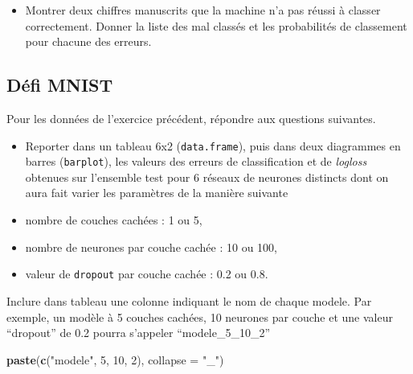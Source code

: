 \documentclass[]{article}
\newenvironment{Shaded}{\begin{snugshade}}{\end{snugshade}}
\newcommand{\KeywordTok}[1]{\textcolor[rgb]{0.13,0.29,0.53}{\textbf{#1}}}
\newcommand{\DataTypeTok}[1]{\textcolor[rgb]{0.13,0.29,0.53}{#1}}
\newcommand{\DecValTok}[1]{\textcolor[rgb]{0.00,0.00,0.81}{#1}}
\newcommand{\StringTok}[1]{\textcolor[rgb]{0.31,0.60,0.02}{#1}}
\newcommand{\CommentTok}[1]{\textcolor[rgb]{0.56,0.35,0.01}{\textit{#1}}}
\newcommand{\OperatorTok}[1]{\textcolor[rgb]{0.81,0.36,0.00}{\textbf{#1}}}
\newcommand{\NormalTok}[1]{#1}
\providecommand{\tightlist}{%
  \setlength{\itemsep}{0pt}\setlength{\parskip}{0pt}}
\begin{document}
\begin{Shaded}
\end{Shaded}

\begin{itemize}
\tightlist
\item
  Montrer deux chiffres manuscrits que la machine n'a pas réussi à
  classer correctement. Donner la liste des mal classés et les
  probabilités de classement pour chacune des erreurs.
\end{itemize}

\subsection{Défi MNIST}\label{defi-mnist}

Pour les données de l'exercice précédent, répondre aux questions
suivantes.

\begin{itemize}
\tightlist
\item
  Reporter dans un tableau 6x2 (\texttt{data.frame}), puis dans deux
  diagrammes en barres (\texttt{barplot}), les valeurs des erreurs de
  classification et de \emph{logloss} obtenues sur l'ensemble test pour
  6 réseaux de neurones distincts dont on aura fait varier les
  paramètres de la manière suivante
\item
  nombre de couches cachées : 1 ou 5,
\item
  nombre de neurones par couche cachée : 10 ou 100,
\item
  valeur de \texttt{dropout} par couche cachée : 0.2 ou 0.8.
\end{itemize}

Inclure dans tableau une colonne indiquant le nom de chaque modele. Par
exemple, un modèle à 5 couches cachées, 10 neurones par couche et une
valeur ``dropout'' de 0.2 pourra s'appeler ``modele\_5\_10\_2''

\begin{Shaded}
\begin{Highlighting}[]
\KeywordTok{paste}\NormalTok{(}\KeywordTok{c}\NormalTok{(}\StringTok{"modele"}\NormalTok{, }\DecValTok{5}\NormalTok{, }\DecValTok{10}\NormalTok{, }\DecValTok{2}\NormalTok{), }\DataTypeTok{collapse =} \StringTok{"_"}\NormalTok{)}
\end{Highlighting}
\end{Shaded}
\end{document}
